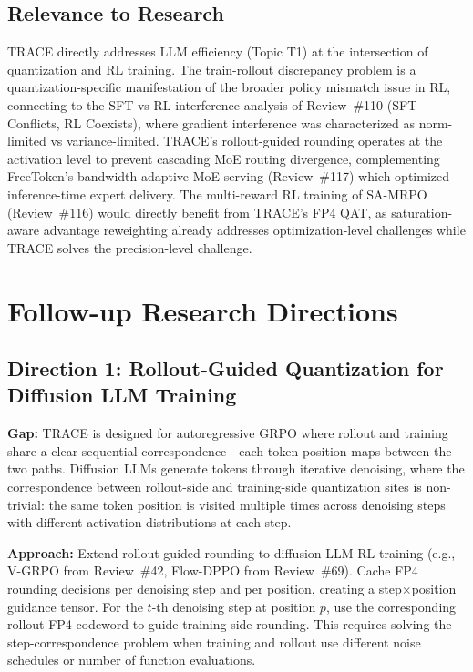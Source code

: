 \documentclass[11pt,a4paper]{article}
\begin{document}
\subsection{Relevance to Research}
TRACE directly addresses LLM efficiency (Topic T1) at the intersection of quantization and RL training. The train-rollout discrepancy problem is a quantization-specific manifestation of the broader policy mismatch issue in RL, connecting to the SFT-vs-RL interference analysis of Review~\#110 (SFT Conflicts, RL Coexists), where gradient interference was characterized as norm-limited vs variance-limited. TRACE's rollout-guided rounding operates at the activation level to prevent cascading MoE routing divergence, complementing FreeToken's bandwidth-adaptive MoE serving (Review~\#117) which optimized inference-time expert delivery. The multi-reward RL training of SA-MRPO (Review~\#116) would directly benefit from TRACE's FP4 QAT, as saturation-aware advantage reweighting already addresses optimization-level challenges while TRACE solves the precision-level challenge.

\section{Follow-up Research Directions}

\subsection{Direction 1: Rollout-Guided Quantization for Diffusion LLM Training}
\textbf{Gap:} TRACE is designed for autoregressive GRPO where rollout and training share a clear sequential correspondence---each token position maps between the two paths. Diffusion LLMs generate tokens through iterative denoising, where the correspondence between rollout-side and training-side quantization sites is non-trivial: the same token position is visited multiple times across denoising steps with different activation distributions at each step.

\textbf{Approach:} Extend rollout-guided rounding to diffusion LLM RL training (e.g., V-GRPO from Review~\#42, Flow-DPPO from Review~\#69). Cache FP4 rounding decisions per denoising step and per position, creating a step$\times$position guidance tensor. For the $t$-th denoising step at position $p$, use the corresponding rollout FP4 codeword to guide training-side rounding. This requires solving the step-correspondence problem when training and rollout use different noise schedules or number of function evaluations.
\end{document}
